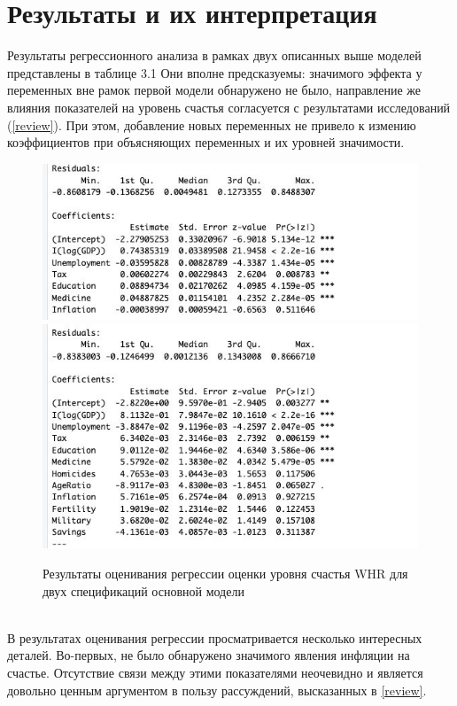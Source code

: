 \documentclass[russian]{vegareport}
\begin{document}
    \chapter{Результаты и их интерпретация}
        Результаты регрессионного анализа в рамках двух описанных выше моделей представлены в таблице 3.1 Они вполне предсказуемы: значимого эффекта у переменных вне рамок первой модели обнаружено не было, направление же влияния показателей на уровень счастья согласуется с результатами исследований (\ref{review}). При этом, добавление новых переменных не привело к измению коэффициентов при объясняющих переменных и их уровней значимости.
        \begin{figure}			
            \centering
            \includegraphics[scale=0.9]{Report/table 2.jpg}
		\includegraphics[scale=0.9]{Report/table 1.jpg}
		\caption{Результаты оценивания регрессии оценки уровня счастья WHR для двух спецификаций основной модели}
            \label{lect02:pic1}
	\end{figure}
        \\
        В результатах оценивания регрессии просматривается несколько интересных деталей. Во-первых, не было обнаружено значимого явления инфляции на счастье. Отсутствие связи между этими показателями неочевидно и является довольно ценным аргументом в пользу рассуждений, высказанных в \ref{review}.
\end{document}
